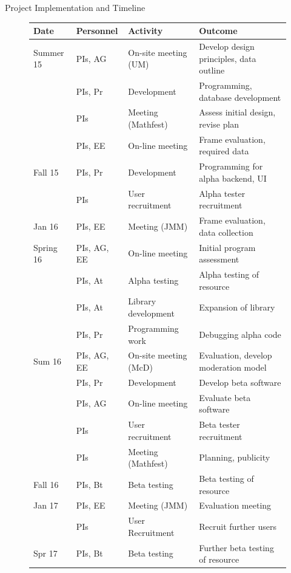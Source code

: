 \documentclass[11pt]{article}
\begin{document}
\begin{section}{Project Implementation and Timeline}
\begin{figure}
\begin{center}
\begin{tabular}{|l|l|l|l|}
  \hline
  \textbf{Date} & \textbf{Personnel} & \textbf{Activity} & \textbf{Outcome}\\
  \hline
  \hline
  Summer 15 & PIs, AG & On-site meeting (UM) & Develop design
        principles, data outline \\
	    & PIs, Pr & Development & Programming, database development \\
	    & PIs & Meeting (Mathfest) & Assess initial design,
        revise plan \\
            & PIs, EE & On-line meeting & Frame evaluation, required data \\
  \hline
  Fall 15 & PIs, Pr & Development & Programming for alpha backend, UI \\
	  & PIs & User recruitment & Alpha tester recruitment \\
  \hline
  Jan 16 & PIs, EE & Meeting (JMM) & Frame evaluation, data collection\\
  \hline
  Spring 16 & PIs, AG, EE & On-line meeting & Initial program assessment \\
            & PIs, At & Alpha testing & Alpha testing of resource \\ 
	    & PIs, At & Library development & Expansion of library \\
            & PIs, Pr & Programming work & Debugging alpha code \\
  \hline 
  Sum 16 & PIs, AG, EE & On-site meeting (McD) & Evaluation, develop
    moderation model \\ 
	    & PIs, Pr & Development & Develop beta software \\
	    & PIs, AG & On-line meeting & Evaluate beta software \\
	    & PIs & User recruitment & Beta tester recruitment \\
	    & PIs & Meeting (Mathfest) & Planning, publicity \\
  \hline
  Fall 16 %
	    & PIs, Bt & Beta testing & Beta testing of resource \\
  \hline
  Jan 17 & PIs, EE & Meeting (JMM) & Evaluation meeting \\
	    & PIs & User Recruitment & Recruit further users \\
  \hline
  Spr 17 & PIs, Bt & Beta testing & Further beta testing of resource \\

\end{tabular}
\end{center}
\end{figure}
\end{section}
\end{document}
